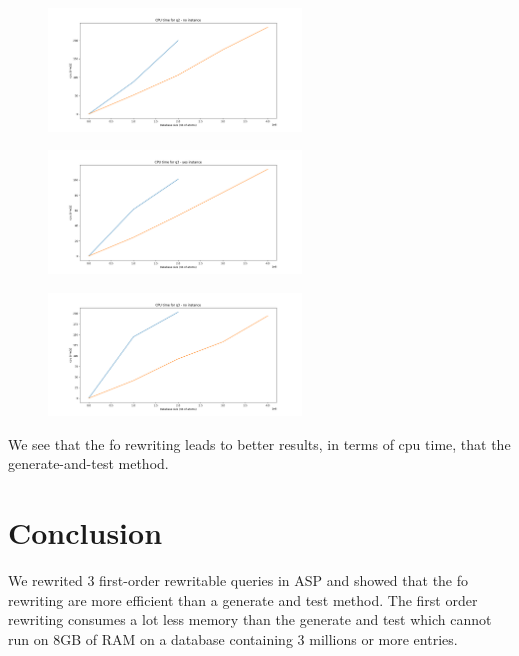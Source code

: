 \begin{figure}[H]
\includegraphics[width=0.6\textwidth]{time_q2_noinstance.png}
\centering
\end{figure}

\begin{figure}[H]
\includegraphics[width=0.6\textwidth]{time_q3_yesinstance.png}
\centering
\end{figure}

\begin{figure}[H]
\includegraphics[width=0.6\textwidth]{time_q3_noinstance.png}
\centering
\end{figure}

We see that the fo rewriting leads to better results, in terms of cpu time, that the generate-and-test method.

\section{Conclusion}

We rewrited 3 first-order rewritable queries in ASP and showed that the fo rewriting are more efficient than a generate and test method. The first order rewriting consumes a lot less memory than the generate and test which cannot run on 8GB of RAM on a database containing 3 millions or more entries.
